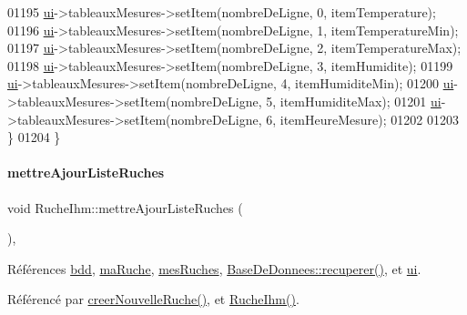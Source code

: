 \begin{DoxyCode}
01195         \hyperlink{class_ruche_ihm_a64786058bd7f88ca2f1e9743bb27c25b}{ui}->tableauxMesures->setItem(nombreDeLigne, 0, itemTemperature);
01196         \hyperlink{class_ruche_ihm_a64786058bd7f88ca2f1e9743bb27c25b}{ui}->tableauxMesures->setItem(nombreDeLigne, 1, itemTemperatureMin);
01197         \hyperlink{class_ruche_ihm_a64786058bd7f88ca2f1e9743bb27c25b}{ui}->tableauxMesures->setItem(nombreDeLigne, 2, itemTemperatureMax);
01198         \hyperlink{class_ruche_ihm_a64786058bd7f88ca2f1e9743bb27c25b}{ui}->tableauxMesures->setItem(nombreDeLigne, 3, itemHumidite);
01199         \hyperlink{class_ruche_ihm_a64786058bd7f88ca2f1e9743bb27c25b}{ui}->tableauxMesures->setItem(nombreDeLigne, 4, itemHumiditeMin);
01200         \hyperlink{class_ruche_ihm_a64786058bd7f88ca2f1e9743bb27c25b}{ui}->tableauxMesures->setItem(nombreDeLigne, 5, itemHumiditeMax);
01201         \hyperlink{class_ruche_ihm_a64786058bd7f88ca2f1e9743bb27c25b}{ui}->tableauxMesures->setItem(nombreDeLigne, 6, itemHeureMesure);
01202 
01203     \}
01204 \}
\end{DoxyCode}
\mbox{\label{class_ruche_ihm_a77cb005fde7e2271e8721c23cef13b3e}} 
\paragraph{\texorpdfstring{mettre\+Ajour\+Liste\+Ruches}{mettreAjourListeRuches}}
{\footnotesize\ttfamily void Ruche\+Ihm\+::mettre\+Ajour\+Liste\+Ruches (\begin{DoxyParamCaption}{ }\end{DoxyParamCaption})\hspace{0.3cm}{\ttfamily [private]}, {\ttfamily [slot]}}



Références \hyperlink{class_ruche_ihm_a0851936fe212e8d40538264f09749153}{bdd}, \hyperlink{class_ruche_ihm_a43a6b1fa31f4fba58d919daae3707b38}{ma\+Ruche}, \hyperlink{class_ruche_ihm_ab7741fa67b19cbb2da7eb12c58cf83c1}{mes\+Ruches}, \hyperlink{class_base_de_donnees_a77539baad389f5acf754cd2cd452403e}{Base\+De\+Donnees\+::recuperer()}, et \hyperlink{class_ruche_ihm_a64786058bd7f88ca2f1e9743bb27c25b}{ui}.



Référencé par \hyperlink{class_ruche_ihm_a2a106515c13c06c51799432a1c2baa3b}{creer\+Nouvelle\+Ruche()}, et \hyperlink{class_ruche_ihm_a04c2544ba4e9cca6c38f553c32d63dee}{Ruche\+Ihm()}.


